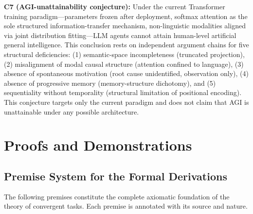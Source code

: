 \documentclass[11pt,a4paper]{article}
\theoremstyle{definition}
\begin{document}
\textbf{C7 (AGI-unattainability conjecture):}
Under the current Transformer training paradigm---parameters frozen after deployment, softmax attention as the sole structured information-transfer mechanism, non-linguistic modalities aligned via joint distribution fitting---LLM agents cannot attain human-level artificial general intelligence. This conclusion rests on independent argument chains for five structural deficiencies: (1) semantic-space incompleteness (truncated projection), (2) misalignment of modal causal structure (attention confined to language), (3) absence of spontaneous motivation (root cause unidentified, observation only), (4) absence of progressive memory (memory-structure dichotomy), and (5) sequentiality without temporality (structural limitation of positional encoding). This conjecture targets only the current paradigm and does not claim that AGI is unattainable under any possible architecture.

\section{Proofs and Demonstrations}
\label{sec:formal}

\subsection{Premise System for the Formal Derivations}

The following premises constitute the complete axiomatic foundation of the theory of convergent tasks. Each premise is annotated with its source and nature.
\end{document}

